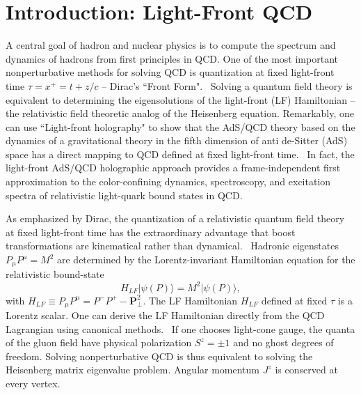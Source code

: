 \documentclass[prd,aps,onecolumn,nofootinbib]{revtex4}
\newcommand{\mbf}[1]{\mathbf{#1}}
\begin{document}

\maketitle



\section{Introduction: Light-Front QCD}	


A central goal of hadron and nuclear physics is to compute the spectrum and dynamics of hadrons from first principles in QCD.  One of the most important nonperturbative methods for solving QCD is quantization at fixed light-front time $\tau = x^+ = t+z/c$  -- Dirac's ``Front Form".~\cite{Dirac:1949cp} Solving a quantum field theory is equivalent to determining the eigensolutions of the light-front (LF) Hamiltonian -- the relativistic field theoretic analog of the Heisenberg equation. Remarkably,  one can use ``Light-front holography" to show that the AdS/QCD theory based on the dynamics of a gravitational theory in the 
fifth dimension of  anti de-Sitter (AdS) space has a direct mapping to QCD defined at fixed light-front time.~\cite{deTeramond:2008ht}  In fact, the light-front 
AdS/QCD  holographic approach provides a frame-independent first approximation to the color-confining dynamics,  spectroscopy, and excitation spectra of relativistic light-quark bound states in QCD.   

As emphasized by Dirac, the quantization of a relativistic quantum field theory at fixed light-front   time  has the extraordinary advantage that 
boost transformations are kinematical rather than dynamical.~\cite{Dirac:1949cp}
Hadronic eigenstates $P_\mu P^\mu  = M^2$ are determined by the
Lorentz-invariant Hamiltonian equation for the relativistic bound-state 
\begin{equation} \label{LFH}
H_{LF} \vert  \psi(P) \rangle =  M^2 \vert  \psi(P) \rangle,
\end{equation}
with  $H_{LF} \equiv P_\mu P^\mu  =  P^- P^+ -  \mbf{P}_\perp^2$.   The LF Hamiltonian $H_{LF}$  defined at fixed $\tau$ is a Lorentz scalar. One can derive  the LF Hamiltonian directly from the QCD Lagrangian using canonical methods.~\cite{Brodsky:1997de} If one chooses light-cone gauge, the quanta of the gluon field have physical polarization $S^z = \pm 1$ and no ghost degrees of freedom. 
Solving nonperturbative QCD is thus equivalent to solving the Heisenberg matrix eigenvalue problem.   Angular momentum $J^z$ is conserved at every vertex.
\end{document}

